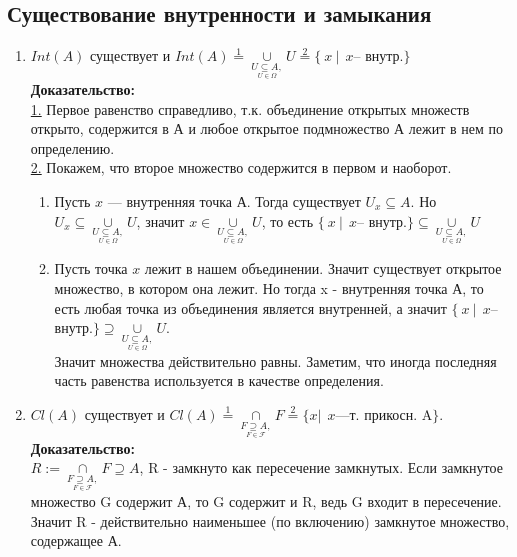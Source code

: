 \subsection{Существование внутренности и замыкания}
\begin{enumerate}
\item $Int(A)$ существует и $Int(A)\overset{1}{=}\underset{\underset{U\in\Omega}{U\subseteq A,}}{\cup}U\overset{2}{=}\lbrace ~x~ |~~x$-- внутр.$\rbrace$
\\
\textbf{Доказательство:}
\\ \underline{1.} Первое равенство справедливо, т.к. объединение открытых множеств открыто, содержится в А и любое открытое подмножество А лежит в нем по определению.
\\ \underline{2.} Покажем, что второе множество содержится в первом и наоборот.
\begin{enumerate}
\item Пусть $x$ --- внутренняя точка А. Тогда существует $U_{x}\subseteq A$. Но $U_{x}\subseteq \underset{\underset{U\in\Omega}{U\subseteq A,}}{\cup}U$, значит $x\in \underset{\underset{U\in\Omega}{U\subseteq A,}}{\cup}U$, то есть $\lbrace ~x~ |~~x$-- внутр.$\rbrace\subseteq \underset{\underset{U\in\Omega}{U\subseteq A,}}{\cup}U$
\item Пусть точка $x$ лежит в нашем объединении. Значит существует открытое множество, в котором она лежит. Но тогда x - внутренняя точка А, то есть любая точка из объединения является внутренней, а значит $\lbrace ~x~ |~~x$-- внутр.$\rbrace\supseteq \underset{\underset{U\in\Omega}{U\subseteq A,}}{\cup}U$.
\\Значит множества действительно равны. Заметим, что иногда последняя часть равенства используется в качестве определения.
\end{enumerate}
\item $Cl(A)$ существует и $Cl(A)\overset{1}{=}\underset{\underset{F\in\mathcal{F}}{ F\supseteq A,}}{\cap}F\overset{2}{=}\lbrace x|~~x$---т. прикосн. A$\rbrace$.
\\ \textbf{Доказательство:}
\\$R:=\underset{\underset{F\in\mathcal{F}}{ F\supseteq A,}}{\cap}F\supseteq A$, R - замкнуто как пересечение замкнутых. Если замкнутое множество G содержит А, то G содержит и R, ведь G входит в пересечение. Значит R - действительно наименьшее (по включению) замкнутое множество, содержащее А.
\end{enumerate}
